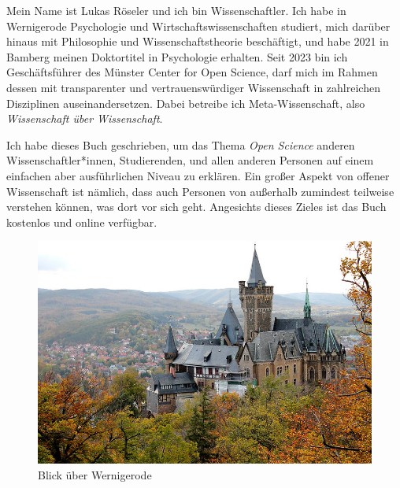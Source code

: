 \documentclass[
  letterpaper,
  DIV=11,
  numbers=noendperiod]{scrreprt}
\begin{document}
\begin{tcolorbox}[enhanced jigsaw, bottomrule=.15mm, toprule=.15mm, opacitybacktitle=0.6, breakable, colback=white, coltitle=black, bottomtitle=1mm, toptitle=1mm, titlerule=0mm, title=\textcolor{quarto-callout-note-color}{\faInfo}\hspace{0.5em}{Über mich}, rightrule=.15mm, arc=.35mm, opacityback=0, leftrule=.75mm, left=2mm, colbacktitle=quarto-callout-note-color!10!white, colframe=quarto-callout-note-color-frame]

Mein Name ist Lukas Röseler und ich bin Wissenschaftler. Ich habe in
Wernigerode Psychologie und Wirtschaftswissenschaften studiert, mich
darüber hinaus mit Philosophie und Wissenschaftstheorie beschäftigt, und
habe 2021 in Bamberg meinen Doktortitel in Psychologie erhalten. Seit
2023 bin ich Geschäftsführer des Münster Center for Open Science, darf
mich im Rahmen dessen mit transparenter und vertrauenswürdiger
Wissenschaft in zahlreichen Disziplinen auseinandersetzen. Dabei
betreibe ich Meta-Wissenschaft, also \emph{Wissenschaft über
Wissenschaft}.

Ich habe dieses Buch geschrieben, um das Thema \emph{Open Science}
anderen Wissenschaftler*innen, Studierenden, und allen anderen Personen
auf einem einfachen aber ausführlichen Niveau zu erklären. Ein großer
Aspekt von offener Wissenschaft ist nämlich, dass auch Personen von
außerhalb zumindest teilweise verstehen können, was dort vor sich geht.
Angesichts dieses Zieles ist das Buch kostenlos und online verfügbar.

\begin{figure}[H]

{\centering \includegraphics[width=6.25in,height=\textheight]{images/wernigerode.jpg}

}

\caption{Blick über Wernigerode}

\end{figure}%

\end{tcolorbox}
\end{document}
